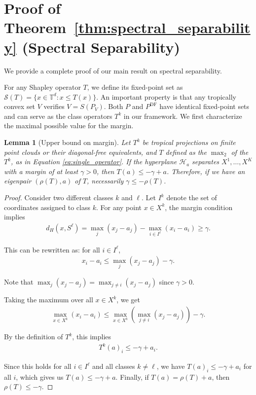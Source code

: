 \documentclass{article}
\newtheorem{lemma}[theorem]{Lemma}
\newcommand{\trop}{\mathbb{T}}
\begin{document}



\newpage
\appendix
\section{Proof of Theorem~\ref{thm:spectral_separability} (Spectral Separability)}\label{appendix:proofs}
We provide a complete proof of our main result on spectral separability.

For any Shapley operator $T$, we define its fixed-point set as $\mathcal{S}(T) = \{x \in \trop^d : x \leq T(x)\}$. An important property is that any tropically convex set $V$ verifies $V = S(P_V)$.
Both $P$ and $P^\text{DF}$ have identical fixed-point sets and can serve as the class operators $T^k$ in our framework. We first characterize the maximal possible value for the margin.

\begin{lemma}[Upper bound on margin]\label{lemma:hyperplane_to_operator}
Let $T^k$ be tropical projections on finite point clouds or their diagonal-free equivalents, and $T$ defined as the $\max_2$ of the $T^k$, as in Equation \ref{eq:single_operator}.
If the hyperplane $\mathcal{H}_a$ separates $X^1,\ldots,X^K$ with a margin of at least $\gamma > 0$, then $T(a) \leq -\gamma + a$.
Therefore, if we have an eigenpair $(\rho(T),a)$ of $T$, necessarily $\gamma \le -\rho(T)$.
\end{lemma}

\begin{proof}
Consider two different classes $k$ and $\ell$. Let $I^k$ denote the set of coordinates assigned to class $k$. For any point $x \in X^k$, the margin condition implies
\begin{align}
d_H(x, S^{\ell}) = \max_j(x_j - a_j) - \max_{i \in I^{\ell}}(x_i - a_i) \geq \gamma.
\end{align}

This can be rewritten as: for all $i \in I^{\ell}$,
\begin{align}
x_i - a_i \leq \max_j(x_j - a_j) - \gamma.
\end{align}

Note that $ \max_j(x_j - a_j) = \max_{j\neq i}(x_j - a_j) $ since $\gamma >0$.

Taking the maximum over all $x \in X^k$, we get
\begin{align}
\max_{x \in X^k}(x_i - a_i) \leq \max_{x \in X^k}\left(\max_{j\neq i}(x_j - a_j)\right) - \gamma.
\end{align}

By the definition of $T^k$, this implies
\begin{align}
T^k(a)_i \leq -\gamma + a_i.
\end{align}

Since this holds for all $i \in I^{\ell}$ and all classes $k \neq \ell$, we have $T(a)_i \leq -\gamma + a_i$ for all $i$, which gives us $T(a) \leq -\gamma + a$.
Finally, if $T(a)=\rho(T)+a$, then $\rho(T)\le -\gamma$.
\end{proof}
\end{document}
